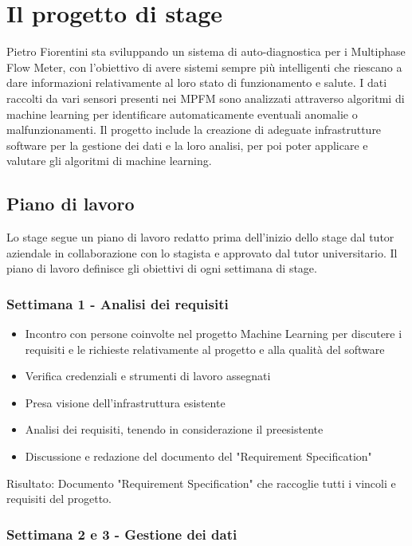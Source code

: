 
\chapter{Il progetto di stage}
Pietro Fiorentini sta sviluppando un sistema di auto-diagnostica per i Multiphase Flow Meter, con l'obiettivo di avere sistemi sempre più intelligenti che riescano a dare informazioni relativamente al loro stato di funzionamento e salute. 
I dati raccolti da vari sensori presenti nei MPFM sono analizzati attraverso algoritmi di machine learning per identificare automaticamente eventuali anomalie o malfunzionamenti.
Il progetto include la creazione di adeguate infrastrutture software per la gestione dei dati e la loro analisi, per poi poter applicare e valutare gli algoritmi di machine learning.

\section{Piano di lavoro} \label{PianoDiLavoro}
Lo stage segue un piano di lavoro redatto prima dell'inizio dello stage dal tutor aziendale in collaborazione con lo stagista e approvato dal tutor universitario.
Il piano di lavoro definisce gli obiettivi di ogni settimana di stage.

\subsection{Settimana 1 - Analisi dei requisiti}

\begin{itemize}
	\item Incontro con persone coinvolte nel progetto Machine Learning per discutere i requisiti e le richieste relativamente al progetto e alla qualità del software
	\item Verifica credenziali e strumenti di lavoro assegnati
	\item Presa visione dell'infrastruttura esistente
	\item Analisi dei requisiti, tenendo in considerazione il preesistente
	\item Discussione e redazione del documento del "Requirement Specification"
\end{itemize}
Risultato: Documento "Requirement Specification" che raccoglie tutti i vincoli e requisiti del progetto.

\subsection{Settimana 2 e 3 - Gestione dei dati}

